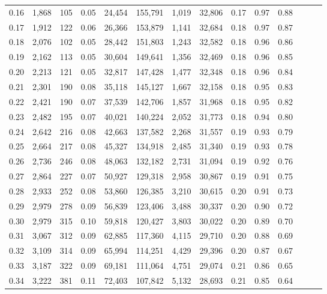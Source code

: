 \begin{tabular}{rrrrrrrrrrrrrr}
0.16 &  1,868 &    105 &  0.05 &   24,454 &  155,791 &   1,019 &  32,806 &  0.17 &  0.97 &      0.88 \\
0.17 &  1,912 &    122 &  0.06 &   26,366 &  153,879 &   1,141 &  32,684 &  0.18 &  0.97 &      0.87 \\
0.18 &  2,076 &    102 &  0.05 &   28,442 &  151,803 &   1,243 &  32,582 &  0.18 &  0.96 &      0.86 \\
0.19 &  2,162 &    113 &  0.05 &   30,604 &  149,641 &   1,356 &  32,469 &  0.18 &  0.96 &      0.85 \\
0.20 &  2,213 &    121 &  0.05 &   32,817 &  147,428 &   1,477 &  32,348 &  0.18 &  0.96 &      0.84 \\
0.21 &  2,301 &    190 &  0.08 &   35,118 &  145,127 &   1,667 &  32,158 &  0.18 &  0.95 &      0.83 \\
0.22 &  2,421 &    190 &  0.07 &   37,539 &  142,706 &   1,857 &  31,968 &  0.18 &  0.95 &      0.82 \\
0.23 &  2,482 &    195 &  0.07 &   40,021 &  140,224 &   2,052 &  31,773 &  0.18 &  0.94 &      0.80 \\
0.24 &  2,642 &    216 &  0.08 &   42,663 &  137,582 &   2,268 &  31,557 &  0.19 &  0.93 &      0.79 \\
0.25 &  2,664 &    217 &  0.08 &   45,327 &  134,918 &   2,485 &  31,340 &  0.19 &  0.93 &      0.78 \\
0.26 &  2,736 &    246 &  0.08 &   48,063 &  132,182 &   2,731 &  31,094 &  0.19 &  0.92 &      0.76 \\
0.27 &  2,864 &    227 &  0.07 &   50,927 &  129,318 &   2,958 &  30,867 &  0.19 &  0.91 &      0.75 \\
0.28 &  2,933 &    252 &  0.08 &   53,860 &  126,385 &   3,210 &  30,615 &  0.20 &  0.91 &      0.73 \\
0.29 &  2,979 &    278 &  0.09 &   56,839 &  123,406 &   3,488 &  30,337 &  0.20 &  0.90 &      0.72 \\
0.30 &  2,979 &    315 &  0.10 &   59,818 &  120,427 &   3,803 &  30,022 &  0.20 &  0.89 &      0.70 \\
0.31 &  3,067 &    312 &  0.09 &   62,885 &  117,360 &   4,115 &  29,710 &  0.20 &  0.88 &      0.69 \\
0.32 &  3,109 &    314 &  0.09 &   65,994 &  114,251 &   4,429 &  29,396 &  0.20 &  0.87 &      0.67 \\
0.33 &  3,187 &    322 &  0.09 &   69,181 &  111,064 &   4,751 &  29,074 &  0.21 &  0.86 &      0.65 \\
0.34 &  3,222 &    381 &  0.11 &   72,403 &  107,842 &   5,132 &  28,693 &  0.21 &  0.85 &      0.64 \\

\end{tabular}
